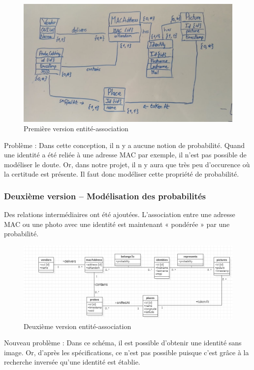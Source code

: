 \begin{figure}[H]
	\centering
	\includegraphics[width=12cm]{images/proto-1.png}
	\caption{Première version entité-association}
	\label{fig:arealytics}
\end{figure}

Problème : Dans cette conception, il n y a aucune notion de probabilité. Quand une identité a été reliée à une
adresse MAC par exemple, il n’est pas possible de modéliser le doute. Or, dans notre projet, il n y aura que très
peu d’occurence où la certitude est présente. Il faut donc modéliser cette propriété de probabilité.

\subsubsection{Deuxième version – Modélisation des probabilités}
Des relations intermédiaires ont été ajoutées. L’association entre une adresse MAC ou une photo avec une
identité est maintenant « pondérée » par une probabilité.

\begin{figure}[H]
	\centering
	\includegraphics[width=12cm]{images/proto-2.png}
	\caption{Deuxième version entité-association}
	\label{fig:arealytics}
\end{figure}

Nouveau problème : Dans ce schéma, il est possible d’obtenir une identité sans image. Or, d’après les
spécifications, ce n’est pas possible puisque c’est grâce à la recherche inversée qu’une identité est établie.

